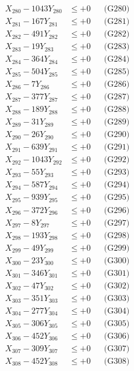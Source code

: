 \documentclass[a4paper,10pt]{article}
\begin{document}
{\begin{align}
X_{280} - 1043Y_{280} &\leq +0 && \text{(G280)} \\
\allowbreak
X_{281} - 167Y_{281} &\leq +0 && \text{(G281)} \\
X_{282} - 491Y_{282} &\leq +0 && \text{(G282)} \\
X_{283} - 19Y_{283} &\leq +0 && \text{(G283)} \\
X_{284} - 364Y_{284} &\leq +0 && \text{(G284)} \\
X_{285} - 504Y_{285} &\leq +0 && \text{(G285)} \\
X_{286} - 7Y_{286} &\leq +0 && \text{(G286)} \\
X_{287} - 377Y_{287} &\leq +0 && \text{(G287)} \\
X_{288} - 189Y_{288} &\leq +0 && \text{(G288)} \\
X_{289} - 31Y_{289} &\leq +0 && \text{(G289)} \\
X_{290} - 26Y_{290} &\leq +0 && \text{(G290)} \\
\allowbreak
X_{291} - 639Y_{291} &\leq +0 && \text{(G291)} \\
X_{292} - 1043Y_{292} &\leq +0 && \text{(G292)} \\
X_{293} - 55Y_{293} &\leq +0 && \text{(G293)} \\
X_{294} - 587Y_{294} &\leq +0 && \text{(G294)} \\
X_{295} - 939Y_{295} &\leq +0 && \text{(G295)} \\
X_{296} - 372Y_{296} &\leq +0 && \text{(G296)} \\
X_{297} - 8Y_{297} &\leq +0 && \text{(G297)} \\
X_{298} - 193Y_{298} &\leq +0 && \text{(G298)} \\
X_{299} - 49Y_{299} &\leq +0 && \text{(G299)} \\
X_{300} - 23Y_{300} &\leq +0 && \text{(G300)} \\
\allowbreak
X_{301} - 346Y_{301} &\leq +0 && \text{(G301)} \\
X_{302} - 47Y_{302} &\leq +0 && \text{(G302)} \\
X_{303} - 351Y_{303} &\leq +0 && \text{(G303)} \\
X_{304} - 277Y_{304} &\leq +0 && \text{(G304)} \\
X_{305} - 306Y_{305} &\leq +0 && \text{(G305)} \\
X_{306} - 452Y_{306} &\leq +0 && \text{(G306)} \\
X_{307} - 309Y_{307} &\leq +0 && \text{(G307)} \\
X_{308} - 452Y_{308} &\leq +0 && \text{(G308)} \\

\end{align}}
\end{document}

